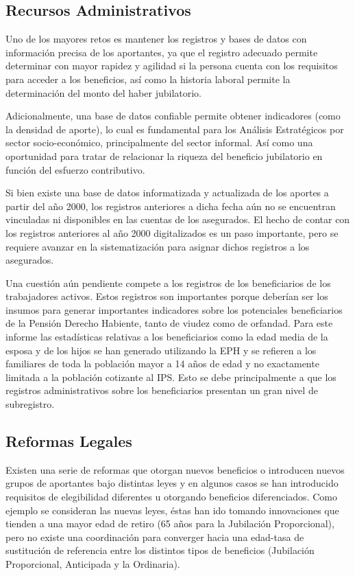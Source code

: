 \documentclass[a4paper,11pt]{article}
\begin{document}
\subsection{Recursos Administrativos}

Uno de los mayores retos es mantener los registros y bases de datos con información precisa de los aportantes, ya que el registro adecuado permite determinar con mayor rapidez y agilidad si la persona cuenta con los requisitos para acceder a los beneficios, así como la historia laboral permite la determinación del monto del haber jubilatorio.  

Adicionalmente, una base de datos confiable permite obtener indicadores (como la densidad de aporte), lo cual es fundamental para los Análisis Estratégicos por sector socio-económico, principalmente del sector informal.  Así como una oportunidad para tratar de relacionar la riqueza del beneficio jubilatorio en función del esfuerzo contributivo.

Si bien existe una base de datos informatizada y actualizada de los aportes a partir del año 2000, los registros anteriores a dicha fecha aún no se encuentran vinculadas ni disponibles en las cuentas de los asegurados.  El hecho de contar con los registros anteriores al año 2000 digitalizados es un paso importante, pero se requiere avanzar en la sistematización para asignar dichos registros a los asegurados.

Una cuestión aún pendiente compete a los registros de los beneficiarios de los trabajadores activos.
Estos registros son importantes porque deberían ser los insumos para generar importantes indicadores sobre los potenciales beneficiarios de la Pensión Derecho Habiente, tanto de viudez como de orfandad. Para este informe las estadísticas relativas a los beneficiarios como la edad media de la esposa y de los hijos se han generado utilizando la EPH y se refieren a los familiares de toda la población mayor a 14 años de edad y no exactamente limitada a la población cotizante al IPS. Esto se debe principalmente a que los registros administrativos sobre los beneficiarios presentan un gran nivel de subregistro.

\subsection{Reformas Legales}

Existen una serie de reformas que otorgan nuevos beneficios o introducen nuevos grupos de aportantes bajo distintas leyes y en algunos casos se han introducido requisitos de elegibilidad diferentes u otorgando beneficios diferenciados. Como ejemplo se consideran las nuevas leyes, éstas han ido tomando innovaciones que tienden a una mayor edad de retiro (65 años para la Jubilación Proporcional), pero no existe una coordinación para converger hacia una edad-tasa de sustitución de referencia entre los distintos tipos de beneficios (Jubilación Proporcional, Anticipada y la Ordinaria).
\end{document}
